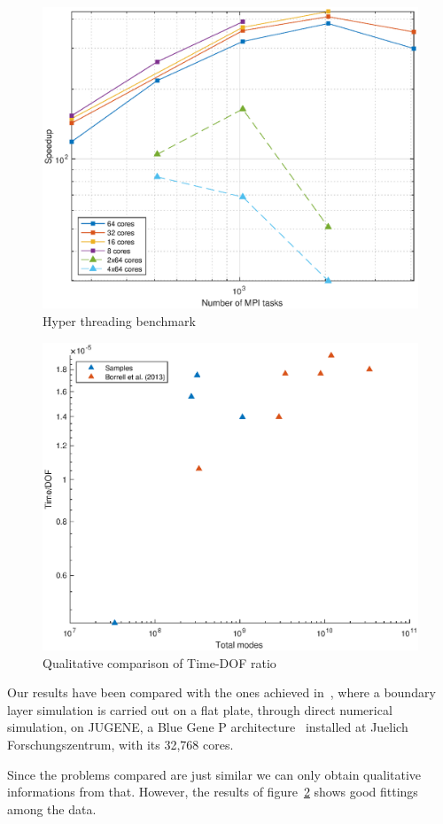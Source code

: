 \begin{figure}
\begin{center}
\includegraphics[scale=0.55]{grafici/hyperthreading}
\caption{Hyper threading benchmark}
\label{hyper}
\end{center}
\end{figure}

\begin{figure}
\begin{center}
\includegraphics[scale=0.55]{grafici/time_dof}
\caption{Qualitative comparison of Time-DOF ratio}
\label{time:dof}
\end{center}
\end{figure}

Our results have been compared with the ones achieved in~\cite{Borrel}, where a boundary layer simulation is carried out on a flat plate, through direct numerical simulation, on JUGENE, a Blue Gene P architecture~\cite{blue:gene:chip}\cite{blue:gene:network} installed at Juelich Forschungszentrum, with its 32,768 cores.\par
Since the problems compared are just similar we can only obtain qualitative informations from that. However, the results of figure~\ref{time:dof} shows good fittings among the data.

